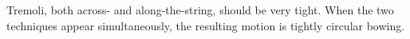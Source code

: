 \documentclass[10pt]{article}
\begin{document}
\begin{textblock}{11}
Tremoli, both across- and along-the-string, should be very tight. When the
two techniques appear simultaneously, the resulting motion is tightly
circular bowing.

\end{textblock}
\end{document}
